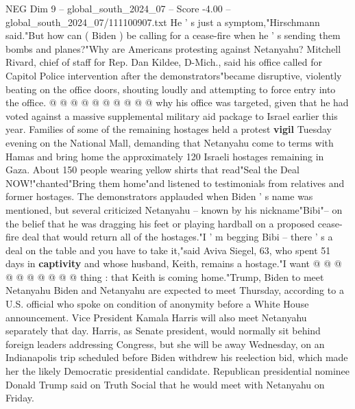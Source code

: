 \begin{textsample}{NEG Dim 9 – global\_south\_2024\_07 – Score -4.00 – global\_south\_2024\_07/111100907.txt}
He ' s just a symptom,"Hirschmann said."But how can ( Biden ) be calling for a cease-fire when he ' s sending them bombs and planes?"Why are Americans protesting against Netanyahu?
Mitchell Rivard, chief of staff for Rep.
Dan Kildee, D-Mich., said his office called for Capitol Police intervention after the demonstrators"became disruptive, violently beating on the office doors, shouting loudly and attempting to force entry into the office. @ @ @ @ @ @ @ @ @ @ why his office was targeted, given that he had voted against a massive supplemental military aid package to Israel earlier this year.
Families of some of the remaining hostages held a protest \textbf{vigil} Tuesday evening on the National Mall, demanding that Netanyahu come to terms with Hamas and bring home the approximately 120 Israeli hostages remaining in Gaza.
About 150 people wearing yellow shirts that read"Seal the Deal NOW!"chanted"Bring them home"and listened to testimonials from relatives and former hostages.
The demonstrators applauded when Biden ' s name was mentioned, but several criticized Netanyahu -- known by his nickname"Bibi"-- on the belief that he was dragging his feet or playing hardball on a proposed cease-fire deal that would return all of the hostages."I ' m begging Bibi -- there ' s a deal on the table and you have to take it,"said Aviva Siegel, 63, who spent 51 days in \textbf{captivity} and whose husband, Keith, remains a hostage."I want @ @ @ @ @ @ @ @ @ @ thing : that Keith is coming home."Trump, Biden to meet Netanyahu Biden and Netanyahu are expected to meet Thursday, according to a U.S. official who spoke on condition of anonymity before a White House announcement.
Vice President Kamala Harris will also meet Netanyahu separately that day.
Harris, as Senate president, would normally sit behind foreign leaders addressing Congress, but she will be away Wednesday, on an Indianapolis trip scheduled before Biden withdrew his reelection bid, which made her the likely Democratic presidential candidate.
Republican presidential nominee Donald Trump said on Truth Social that he would meet with Netanyahu on Friday.

\end{textsample}
